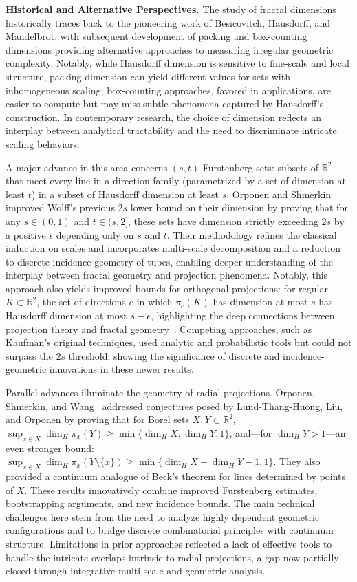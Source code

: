 \documentclass[sigconf]{acmart}
\begin{document}
\textbf{Historical and Alternative Perspectives.} The study of fractal dimensions historically traces back to the pioneering work of Besicovitch, Hausdorff, and Mandelbrot, with subsequent development of packing and box-counting dimensions providing alternative approaches to measuring irregular geometric complexity. Notably, while Hausdorff dimension is sensitive to fine-scale and local structure, packing dimension can yield different values for sets with inhomogeneous scaling; box-counting approaches, favored in applications, are easier to compute but may miss subtle phenomena captured by Hausdorff's construction. In contemporary research, the choice of dimension reflects an interplay between analytical tractability and the need to discriminate intricate scaling behaviors.

A major advance in this area concerns $(s, t)$-Furstenberg sets: subsets of $\mathbb{R}^2$ that meet every line in a direction family (parametrized by a set of dimension at least $t$) in a subset of Hausdorff dimension at least $s$. Orponen and Shmerkin~\cite{ref68} improved Wolff's previous $2s$ lower bound on their dimension by proving that for any $s \in (0,1)$ and $t\in(s,2]$, these sets have dimension strictly exceeding $2s$ by a positive $\epsilon$ depending only on $s$ and $t$. Their methodology refines the classical induction on scales and incorporates multi-scale decomposition and a reduction to discrete incidence geometry of tubes, enabling deeper understanding of the interplay between fractal geometry and projection phenomena. Notably, this approach also yields improved bounds for orthogonal projections: for regular $K \subset \mathbb{R}^2$, the set of directions $e$ in which $\pi_e(K)$ has dimension at most $s$ has Hausdorff dimension at most $s - \epsilon$, highlighting the deep connections between projection theory and fractal geometry~\cite{ref68}. Competing approaches, such as Kaufman's original techniques, used analytic and probabilistic tools but could not surpass the $2s$ threshold, showing the significance of discrete and incidence-geometric innovations in these newer results.

Parallel advances illuminate the geometry of radial projections. Orponen, Shmerkin, and Wang~\cite{ref92} addressed conjectures posed by Lund-Thang-Huong, Liu, and Orponen by proving that for Borel sets $X, Y \subset \mathbb{R}^2$, $\sup_{x \in X} \dim_H \pi_x(Y) \geq \min\{ \dim_H X, \dim_H Y, 1 \}$, and—for $\dim_H Y > 1$—an even stronger bound: $\sup_{x \in X} \dim_H \pi_x(Y \setminus \{x\}) \geq \min\{\dim_H X + \dim_H Y - 1, 1\}$. They also provided a continuum analogue of Beck's theorem for lines determined by points of $X$. These results innovatively combine improved Furstenberg estimates, bootstrapping arguments, and new incidence bounds. The main technical challenges here stem from the need to analyze highly dependent geometric configurations and to bridge discrete combinatorial principles with continuum structure. Limitations in prior approaches reflected a lack of effective tools to handle the intricate overlaps intrinsic to radial projections, a gap now partially closed through integrative multi-scale and geometric analysis.
\end{document}
